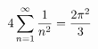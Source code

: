 \documentclass[preview]{standalone}
\begin{document}
\begin{align*}
\special{dvisvgm:raw <g id='unique000'>}4\displaystyle\sum_{n=1}^{\infty}\dfrac{1}{n^2}=\dfrac{2\pi^2}{3}\special{dvisvgm:raw </g>}
\end{align*}
\end{document}
